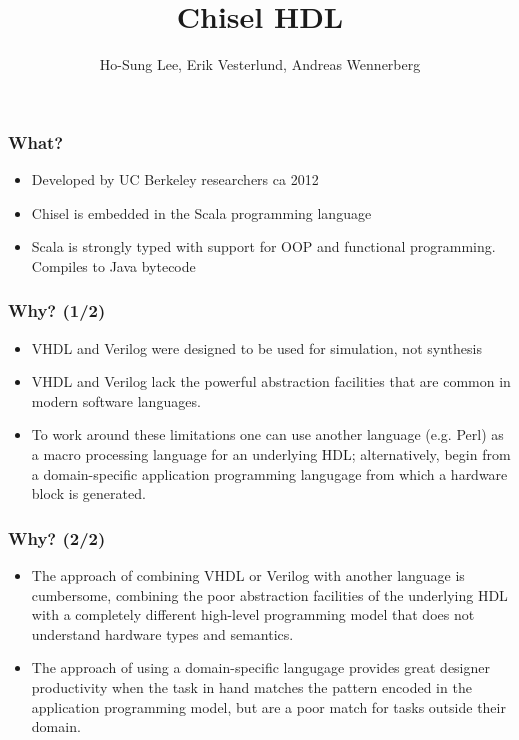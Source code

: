 \documentclass{beamer}
\title{Chisel HDL}
\author{Ho-Sung Lee, Erik Vesterlund, Andreas Wennerberg}
\begin{document}
\begin{frame}
\titlepage
\end{frame}

\begin{frame}
\frametitle{What?}
\begin{itemize}

\item Developed by UC Berkeley researchers ca 2012

\item Chisel is embedded in the Scala programming language

\item Scala is strongly typed with support for OOP and functional programming. Compiles to Java bytecode

\end{itemize}
\end{frame}

\begin{frame}
\frametitle{Why? (1/2)}
\begin{itemize}

\item VHDL and Verilog were designed to be used for simulation, not synthesis

\item VHDL and Verilog lack the powerful abstraction facilities that are common in modern software languages.

\item To work around these limitations one can use another language (e.g. Perl) as a macro processing language for an underlying HDL; alternatively, begin from a domain-specific application programming langugage from which a hardware block is generated.

\end{itemize}
\end{frame}

\begin{frame}
\frametitle{Why? (2/2)}
\begin{itemize}

\item The approach of combining VHDL or Verilog with another language is cumbersome, combining the poor abstraction facilities of the underlying HDL with a completely different high-level programming model that does not understand hardware types and semantics.

\item The approach of using a domain-specific langugage provides great designer productivity when the task in hand matches the pattern encoded in the application programming model, but are a poor match for tasks outside their domain.

\end{itemize}
\end{frame}
\end{document}
